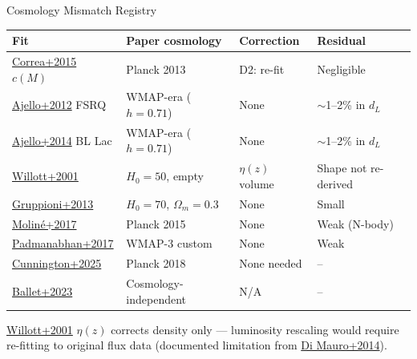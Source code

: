 \begin{frame}{Cosmology Mismatch Registry}
\begin{table}\centering\scriptsize
\begin{tabular}{llll}
\toprule
Fit & Paper cosmology & Correction & Residual \\
\midrule
\href{https://arxiv.org/abs/1502.00391}{Correa+2015} $c(M)$ & Planck 2013 & D2: re-fit & Negligible \\
\href{https://arxiv.org/abs/1110.3787}{Ajello+2012} FSRQ & WMAP-era ($h{=}0.71$) & None & $\sim$1--2\% in $d_L$ \\
\href{https://arxiv.org/abs/1310.0006}{Ajello+2014} BL Lac & WMAP-era ($h{=}0.71$) & None & $\sim$1--2\% in $d_L$ \\
\href{https://arxiv.org/abs/astro-ph/0010419}{Willott+2001} & $H_0{=}50$, empty & $\eta(z)$ volume & Shape not re-derived \\
\href{https://arxiv.org/abs/1302.5209}{Gruppioni+2013} & $H_0{=}70$, $\Omega_m{=}0.3$ & None & Small \\
\href{https://arxiv.org/abs/1603.04057}{Moliné+2017} & Planck 2015 & None & Weak (N-body) \\
\href{https://arxiv.org/abs/1611.06235}{Padmanabhan+2017} & WMAP-3 custom & None & Weak \\
\href{https://arxiv.org/abs/2510.27549}{Cunnington+2025} & Planck 2018 & None needed & -- \\
\href{https://arxiv.org/abs/2307.12546}{Ballet+2023} & Cosmology-independent & N/A & -- \\
\bottomrule
\end{tabular}
\end{table}

\vspace{0.2cm}
\href{https://arxiv.org/abs/astro-ph/0010419}{Willott+2001} $\eta(z)$ corrects density only --- luminosity rescaling would require re-fitting to original flux data (documented limitation from \href{https://arxiv.org/abs/1304.0908}{Di Mauro+2014}).
\end{frame}
